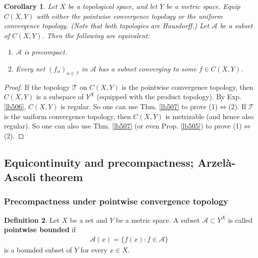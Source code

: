 \documentclass[12pt,b5paper,notitlepage]{article}
\theoremstyle{definition}
\newtheorem{df}{Definition}[section]
\theoremstyle{plain}
\newtheorem{co}[df]{Corollary}
\newcommand{\mc}{\mathcal}
\newcommand{\scr}{\mathscr}
\numberwithin{equation}{section}
\begin{document}
\begin{co}\label{lb508}
Let $X$ be a topological space, and let $Y$ be a metric space. Equip $C(X,Y)$ with either the pointwise convergence topology or the uniform convergence topology. (Note that both topologies are Hausdorff.) Let $\scr A$ be a subset of $C(X,Y)$. Then the following are equivalent:
\begin{enumerate}[label=(\arabic*)]
\item $\scr A$ is precompact.
\item Every net $(f_\alpha)_{\alpha\in\scr I}$  in $\scr A$ has a subnet converging to some $f\in C(X,Y)$.
\end{enumerate}
\end{co}

\begin{proof}
If the topology $\mc T$ on $C(X,Y)$ is the pointwise convergence topology, then $C(X,Y)$ is a subspace of $Y^X$ (equipped with the product topology). By Exp. \ref{lb506}, $C(X,Y)$ is regular. So one can use Thm. \ref{lb507} to prove (1)$\Leftrightarrow$(2). If $\mc T$ is the uniform convergence topology, then $C(X,Y)$ is metrizable (and hence also regular). So one can also use Thm. \ref{lb507} (or even Prop. \ref{lb505}) to prove (1)$\Leftrightarrow$(2). 
\end{proof}






\subsection{Equicontinuity and precompactness; Arzel\`a-Ascoli theorem}\label{lb517}


\subsubsection{Precompactness under pointwise convergence topology}


\begin{df}
Let $X$ be a set and $Y$ be a metric space. A subset $\scr A\subset Y^X$ is called \textbf{pointwise bounded}  if
\begin{align}
\scr A(x)=\{f(x):f\in\scr A\}
\end{align}
is a bounded subset of $Y$ for every $x\in X$.
\end{df}
\end{document}
